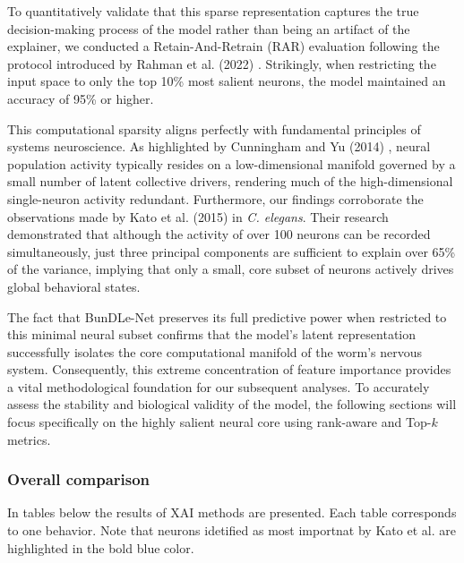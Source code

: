\documentclass{article}
\begin{document}
To quantitatively validate that this
 sparse representation captures the true decision-making process
of the model rather than being an artifact of the explainer,
we conducted a Retain-And-Retrain (RAR) evaluation following the protocol introduced
by Rahman et al. (2022) \cite{rahman2022interpreting}. Strikingly, when restricting
the input space to only the top 10\% most salient neurons, the model maintained an accuracy of 95\% or higher. 

This computational sparsity aligns perfectly with fundamental principles
of systems neuroscience. As highlighted by Cunningham and Yu (2014) \cite{cunningham2014dimensionality},
neural population activity typically resides on a low-dimensional manifold governed by a small number of latent collective drivers,
rendering much of the high-dimensional single-neuron activity redundant. Furthermore, our findings corroborate the
observations made by Kato et al. (2015) \cite{kato2015global} in \textit{C. elegans}. Their research demonstrated
that although the activity of over 100 neurons can be recorded simultaneously,
just three principal components are sufficient to explain over 65\% of the variance,
implying that only a small, core subset of neurons actively drives global behavioral states.

The fact that BunDLe-Net preserves its full predictive power
 when restricted to this minimal neural subset confirms that the model's latent
representation successfully isolates the core computational manifold of the worm's nervous
system. Consequently, this extreme concentration of feature importance provides a
vital methodological foundation for our subsequent analyses. 
To accurately assess the stability and biological validity
of the model, the following sections will focus specifically on the highly salient
neural core using rank-aware and Top-$k$ metrics.



\subsubsection{Overall comparison}

In tables below the results of XAI methods are presented. Each table corresponds to one behavior. Note that neurons idetified as most importnat by Kato et al. are highlighted in the bold blue color. 

\newcommand{\kato}[1]{\textcolor{blue}{\textbf{#1}}}
\end{document}
